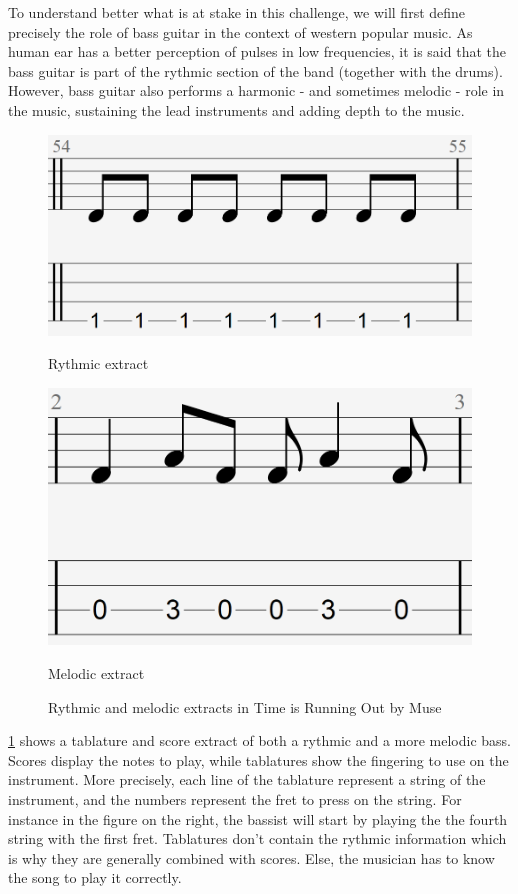 \documentclass[11pt, a4paper]{article}
\begin{document}
To understand better what is at stake in this challenge, we will first define precisely the role of bass guitar in the context of western popular music.
As human ear has a better perception of pulses in low frequencies,
it is said that the bass guitar is part of the rythmic section of the band (together with the drums)\cite{hoveSuperiorTimePerception2014}.
However, bass guitar also performs a harmonic - and sometimes melodic - role in the music, sustaining the lead instruments and adding depth to the music.
\begin{figure}[h!]
    \centering
    \begin{minipage}{0.45\textwidth}
        \centering
        \includegraphics[width=.5\linewidth]{figs/rythmic_tab_TIRO.png}
        \caption{Rythmic extract}
    \end{minipage}%
    \hfill
    \begin{minipage}{0.45\textwidth}
        \centering
        \includegraphics[width=.5\linewidth]{figs/melodic_tab_TIRO.png}
        \caption{Melodic extract}
    \end{minipage}
    \label{fig:bass_tab_TIRO}
    \caption{Rythmic and melodic extracts in Time is Running Out by Muse}
\end{figure}

\ref{fig:bass_tab_TIRO} shows a tablature and score extract of both a rythmic and a more melodic bass.
Scores display the notes to play, while tablatures show the fingering to use on the instrument.
More precisely, each line of the tablature represent a string of the instrument, and the numbers represent the fret to press on the string.
For instance in the figure on the right, the bassist will start by playing the the fourth string with the first fret.
Tablatures don't contain the rythmic information which is why they are generally combined with scores.
Else, the musician has to know the song to play it correctly.
\end{document}
